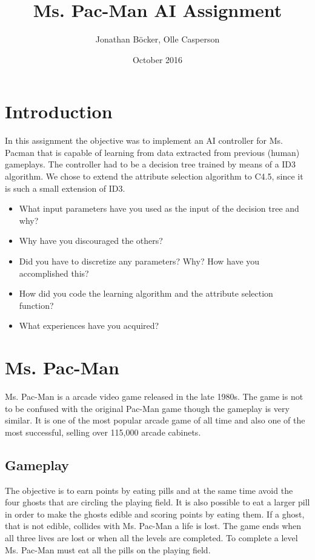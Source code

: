 \documentclass{article}
\title{Ms. Pac-Man AI Assignment}
\author{Jonathan Böcker, Olle Casperson }
\date{October 2016}
\begin{document}
\maketitle

\section{Introduction}
In this assignment the objective was to implement an AI controller for Ms. Pacman that is capable of learning from data extracted from previous (human) gameplays. The controller had to be a decision tree
trained by means of a ID3 algorithm\citep{russel2010artifical}. We chose to extend the attribute selection algorithm to C4.5, since it is such a small extension of ID3.

\iffalse
\begin{itemize}
    \item What input parameters have you used as the input of the decision tree and why?
    \item Why have you discouraged the others?
    \item Did you have to discretize any parameters? Why? How have you accomplished this?
    \item How did you code the learning algorithm and the attribute selection function?
    \item What experiences have you acquired?
\end{itemize}

\section{Ms. Pac-Man}
Ms. Pac-Man is a arcade video game released in the late 1980s. The game is not to be confused with the original Pac-Man game though the gameplay is very similar. It is one of the most popular arcade game of all time and also one of the most successful, selling over 115,000 arcade cabinets.  \citep{mspacmanwiki}

    \subsection{Gameplay}
    The objective is to earn points by eating pills and at the same time avoid the four ghosts that are circling the playing field. It is also possible to eat a larger pill in order to make the ghosts edible and scoring points by eating them. If a ghost, that is not edible, collides with Ms. Pac-Man a life is lost. The game ends when all three lives are lost or when all the levels are completed. To complete a level Ms. Pac-Man must eat all the pills on the playing field.
\end{document}
